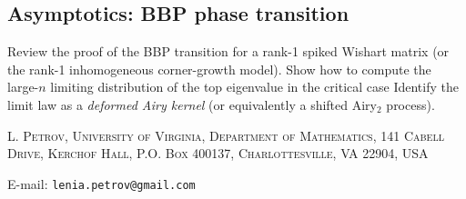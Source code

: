 \documentclass[letterpaper,11pt,oneside,reqno]{article}
\numberwithin{equation}{section}
\theoremstyle{definition}
\begin{document}
\subsection{Asymptotics: BBP phase transition}
Review the proof of the BBP transition for a rank-1 spiked
Wishart matrix (or the rank-1 inhomogeneous corner-growth
model).  Show how to compute the large-\(n\) limiting
distribution of the top eigenvalue in the critical case
Identify the
limit law as a \emph{deformed Airy kernel} (or equivalently
a shifted Airy$_2$ process).








\medskip

\textsc{L. Petrov, University of Virginia, Department of Mathematics, 141 Cabell Drive, Kerchof Hall, P.O. Box 400137, Charlottesville, VA 22904, USA}

E-mail: \texttt{lenia.petrov@gmail.com}
\end{document}
